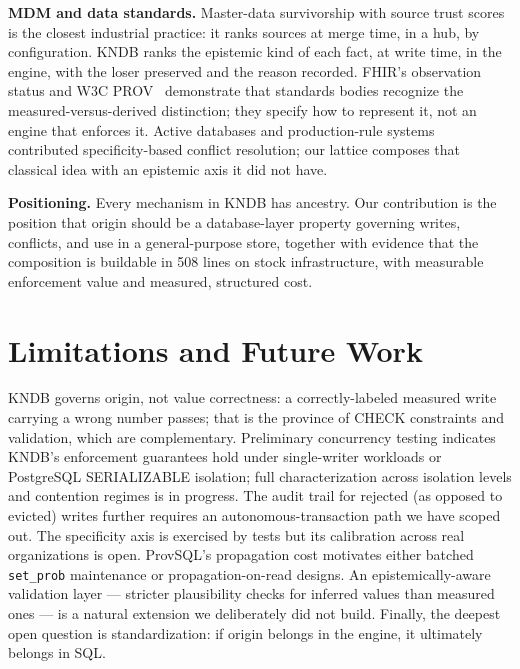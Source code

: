 \documentclass[sigconf,nonacm]{acmart}
\begin{document}
\noindent\textbf{MDM and data standards.} Master-data survivorship with source trust scores~\cite{informatica} is the closest industrial practice: it ranks sources at merge time, in a hub, by configuration. KNDB ranks the epistemic kind of each fact, at write time, in the engine, with the loser preserved and the reason recorded. FHIR's observation status and W3C PROV~\cite{prov} demonstrate that standards bodies recognize the measured-versus-derived distinction; they specify how to represent it, not an engine that enforces it. Active databases and production-rule systems~\cite{hipac} contributed specificity-based conflict resolution; our lattice composes that classical idea with an epistemic axis it did not have.

\noindent\textbf{Positioning.} Every mechanism in KNDB has ancestry. Our contribution is the position that origin should be a database-layer property governing writes, conflicts, and use in a general-purpose store, together with evidence that the composition is buildable in 508 lines on stock infrastructure, with measurable enforcement value and measured, structured cost.

\section{Limitations and Future Work}
KNDB governs origin, not value correctness: a correctly-labeled measured write carrying a wrong number passes; that is the province of CHECK constraints and validation, which are complementary. Preliminary concurrency testing indicates KNDB's enforcement guarantees hold under single-writer workloads or PostgreSQL SERIALIZABLE isolation; full characterization across isolation levels and contention regimes is in progress. The audit trail for rejected (as opposed to evicted) writes further requires an autonomous-transaction path we have scoped out. The specificity axis is exercised by tests but its calibration across real organizations is open. ProvSQL's propagation cost motivates either batched \texttt{set\_prob} maintenance or propagation-on-read designs. An epistemically-aware validation layer --- stricter plausibility checks for inferred values than measured ones --- is a natural extension we deliberately did not build. Finally, the deepest open question is standardization: if origin belongs in the engine, it ultimately belongs in SQL.
\end{document}
